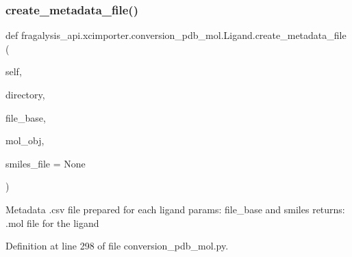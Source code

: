 \subsubsection{\texorpdfstring{create\+\_\+metadata\+\_\+file()}{create\_metadata\_file()}}
{\footnotesize\ttfamily def fragalysis\+\_\+api.\+xcimporter.\+conversion\+\_\+pdb\+\_\+mol.\+Ligand.\+create\+\_\+metadata\+\_\+file (\begin{DoxyParamCaption}\item[{}]{self,  }\item[{}]{directory,  }\item[{}]{file\+\_\+base,  }\item[{}]{mol\+\_\+obj,  }\item[{}]{smiles\+\_\+file = {\ttfamily None} }\end{DoxyParamCaption})}

\begin{DoxyVerb}Metadata .csv file prepared for each ligand
params: file_base and smiles
returns: .mol file for the ligand
\end{DoxyVerb}
 

Definition at line 298 of file conversion\+\_\+pdb\+\_\+mol.\+py.


